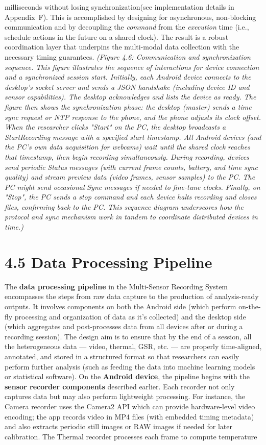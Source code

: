 milliseconds without losing synchronization(see implementation details in Appendix~F). This is accomplished by designing for asynchronous, non-blocking communication and by decoupling the \textit{command} from the \textit{execution} time (i.e., schedule actions in the future on a shared clock). The result is a robust coordination layer that underpins the multi-modal data collection with the necessary timing guarantees. \textit{(Figure 4.6: Communication and synchronization sequence. This figure illustrates the sequence of interactions for device connection and a synchronized session start. Initially, each Android device connects to the desktop's socket server and sends a JSON handshake (including device ID and sensor capabilities). The desktop acknowledges and lists the device as ready. The figure then shows the} \textit{synchronization phase: the desktop (master) sends a time sync request or NTP response to the phone, and the phone adjusts its clock offset. When the researcher clicks "Start" on the PC, the desktop broadcasts a} \textit{StartRecording} \textit{message with a specified start timestamp. All Android devices (and the PC's own data acquisition for webcams) wait until the shared clock reaches that timestamp, then begin recording simultaneously. During recording, devices send periodic} \textit{Status} \textit{messages (with current frame counts, battery, and time sync quality) and stream preview data (video frames, sensor samples) to the PC. The PC might send occasional} \textit{Sync} \textit{messages if needed to fine-tune clocks. Finally, on "Stop", the PC sends a stop command and each device halts recording and closes files, confirming back to the PC. This sequence diagram underscores how the protocol and sync mechanism work in tandem to coordinate distributed devices in time.)} \section{4.5 Data Processing Pipeline} The \textbf{data processing pipeline} in the Multi-Sensor Recording System encompasses the steps from raw data capture to the production of analysis-ready outputs. It involves components on both the Android side (which perform on-the-fly processing and organization of data as it's collected) and the desktop side (which aggregates and post-processes data from all devices after or during a recording session). The design aim is to ensure that by the end of a session, all the heterogeneous data --- video, thermal, GSR, etc. --- are properly time-aligned, annotated, and stored in a structured format so that researchers can easily perform further analysis (such as feeding the data into machine learning models or statistical software). On the \textbf{Android device}, the pipeline begins with the \textbf{sensor recorder components} described earlier. Each recorder not only captures data but may also perform lightweight processing. For instance, the Camera recorder uses the Camera2 API which can provide hardware-level video encoding; the app records video in MP4 files (with embedded timing metadata) and also extracts periodic still images or RAW images if needed for later calibration. The Thermal recorder processes each frame to compute temperature 